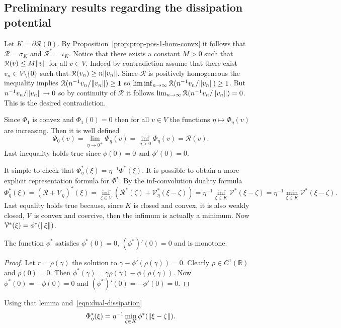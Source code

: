\subsection{Preliminary results regarding the dissipation potential}

Let $K=\partial\mathcal{R}(0)$. By Proposition~\ref{prop:prop-pos-1-hom-convx} it follows that $\mathcal{R}=\sigma_K$ and $\mathcal{R}^*=\iota_K$. Notice that there exists a constant $M>0$ such that $\mathcal{R}(v)\le M\lVert v\rVert$ for all $v\in V$. Indeed by contradiction assume that there exist $v_n\in V\setminus\{0\}$ such that $\mathcal{R}(v_n)\ge n\lVert v_n\rVert$. Since $\mathcal{R}$ is positively homogeneous the inequality implies $\mathcal{R}(n^{-1}v_n/\lVert v_n\rVert)\ge1$ so $\liminf_{n\to\infty}\mathcal{R}(n^{-1}v_n/\lVert v_n\rVert)\ge1$. But $n^{-1}v_n/\lVert v_n\rVert\to0$ so by continuity of $\mathcal{R}$ it follows $\lim_{n\to\infty}\mathcal{R}(n^{-1}v_n/\lVert v_n\rVert)=0$. This is the desired contradiction.

Since $\Phi_1$ is convex and $\Phi_1(0)=0$ then for all $v\in V$ the functions $\eta\mapsto\Phi_\eta(v)$ are increasing. Then it is well defined
\begin{equation*}
\Phi_0(v)=\lim_{\eta\to0^+}\Phi_\eta(v)=\inf_{\eta>0}\Phi_\eta(v)=\mathcal{R}(v).
\end{equation*}
Last inequality holds true since $\phi(0)=0$ and $\phi'(0)=0$.

It simple to check that $\Phi_\eta^*(\xi)=\eta^{-1}\Phi^*(\xi)$. It is possible to obtain a more explicit representation formula for $\Phi^*$. By the inf-convolution duality formula
\begin{equation}
\label{eqn:dual-dissipation}
\Phi_\eta^*(\xi)=\left(\mathcal{R}+\mathcal{V}_\eta\right)^*(\xi)=\inf_{\zeta\in V}\left(\mathcal{R}^*(\zeta)+\mathcal{V}_\eta^*(\xi-\zeta)\right)=\eta^{-1}\inf_{\zeta\in K}\mathcal{V}^*(\xi-\zeta)=\eta^{-1}\min_{\zeta\in K}\mathcal{V}^*(\xi-\zeta).
\end{equation}
Last equality holds true because, since $K$ is closed and convex, it is also weakly closed, $\mathcal{V}$ is convex and coercive, then the infimum is actually a minimum. Now $\mathcal{V}^*(\xi)=\phi^*(\lVert\xi\rVert)$. \begin{lemma}
The function $\phi^*$ satisfies $\phi^*(0)=0$, $(\phi^*)'(0)=0$ and is monotone.
\end{lemma}
\begin{proof}
Let $r=\rho(\gamma)$ the solution to $\gamma-\phi'(\rho(\gamma))=0$. Clearly $\rho\in C^1(\mathbb{R})$ and $\rho(0)=0$. Then $\phi^*(\gamma)=\gamma\rho(\gamma)-\phi(\rho(\gamma))$. Now $\phi^*(0)=-\phi(0)=0$ and $(\phi^*)'(0)=-\phi'(0)=0$.
\end{proof}
Using that lemma and~\eqref{eqn:dual-dissipation}
\begin{equation}
\label{eqn:dual-dissipation-1}
\Phi_\eta^*(\xi)=\eta^{-1}\min_{\zeta\in K}\phi^*(\lVert\xi-\zeta\rVert).
\end{equation}

